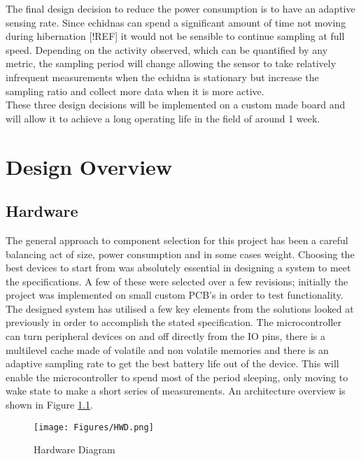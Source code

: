 \documentclass[12pt,openany,a4paper]{book}
\begin{document}
		The final design decision to reduce the power consumption is to have an adaptive sensing rate. Since echidnas can spend a significant amount of time not moving during hibernation [!REF] it would not be sensible to continue sampling at full speed. Depending on the activity observed, which can be quantified by any metric, the sampling period will change allowing the sensor to take relatively infrequent measurements when the echidna is stationary but increase the sampling ratio and collect more data when it is more active. \\
		
		These three design decisions will be implemented on a custom made board and will allow it to achieve a long operating life in the field of around 1 week.
		

\chapter{Design Overview}
	
	\section{Hardware} \label{sec:components}
		The general approach to component selection for this project has been a careful balancing act of size, power consumption and in some cases weight. Choosing the best devices to start from was absolutely essential in designing a system to meet the specifications. A few of these were selected over a few revisions; initially the project was implemented on small custom PCB's in order to test functionality. \\
		
		The designed system has utilised a few key elements from the solutions looked at previously in order to accomplish the stated specification. The microcontroller can turn peripheral devices on and off directly from the IO pins, there is a multilevel cache made of volatile and non volatile memories and there is an adaptive sampling rate to get the best battery life out of the device. This will enable the microcontroller to spend most of the period sleeping, only moving to wake state to make a short series of measurements. An architecture overview is shown in Figure \ref{fig:HWD}.
		
		\begin{figure}[H]
			\centering
			\texttt{[image: Figures/HWD.png]}
			\caption{Hardware Diagram}
			\label{fig:HWD}
		\end{figure}		
\end{document}
